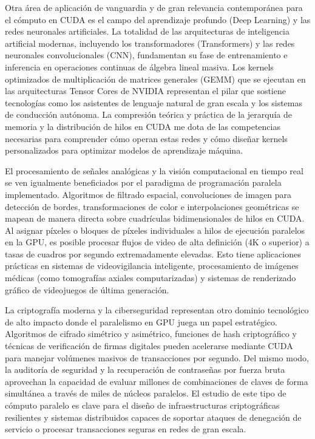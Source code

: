 Otra área de aplicación de vanguardia y de gran relevancia contemporánea para el cómputo en CUDA es el campo del aprendizaje profundo (Deep Learning) y las redes neuronales artificiales. La totalidad de las arquitecturas de inteligencia artificial modernas, incluyendo los transformadores (Transformers) y las redes neuronales convolucionales (CNN), fundamentan su fase de entrenamiento e inferencia en operaciones continuas de álgebra lineal masiva. Los kernels optimizados de multiplicación de matrices generales (GEMM) que se ejecutan en las arquitecturas Tensor Cores de NVIDIA representan el pilar que sostiene tecnologías como los asistentes de lenguaje natural de gran escala y los sistemas de conducción autónoma. La compresión teórica y práctica de la jerarquía de memoria y la distribución de hilos en CUDA me dota de las competencias necesarias para comprender cómo operan estas redes y cómo diseñar kernels personalizados para optimizar modelos de aprendizaje máquina.

El procesamiento de señales analógicas y la visión computacional en tiempo real se ven igualmente beneficiados por el paradigma de programación paralela implementado. Algoritmos de filtrado espacial, convoluciones de imagen para detección de bordes, transformaciones de color e interpolaciones geométricas se mapean de manera directa sobre cuadrículas bidimensionales de hilos en CUDA. Al asignar píxeles o bloques de píxeles individuales a hilos de ejecución paralelos en la GPU, es posible procesar flujos de video de alta definición (4K o superior) a tasas de cuadros por segundo extremadamente elevadas. Esto tiene aplicaciones prácticas en sistemas de videovigilancia inteligente, procesamiento de imágenes médicas (como tomografías axiales computarizadas) y sistemas de renderizado gráfico de videojuegos de última generación.

La criptografía moderna y la ciberseguridad representan otro dominio tecnológico de alto impacto donde el paralelismo en GPU juega un papel estratégico. Algoritmos de cifrado simétrico y asimétrico, funciones de hash criptográfico y técnicas de verificación de firmas digitales pueden acelerarse mediante CUDA para manejar volúmenes masivos de transacciones por segundo. Del mismo modo, la auditoría de seguridad y la recuperación de contraseñas por fuerza bruta aprovechan la capacidad de evaluar millones de combinaciones de claves de forma simultánea a través de miles de núcleos paralelos. El estudio de este tipo de cómputo paralelo es clave para el diseño de infraestructuras criptográficas resilientes y sistemas distribuidos capaces de soportar ataques de denegación de servicio o procesar transacciones seguras en redes de gran escala.

